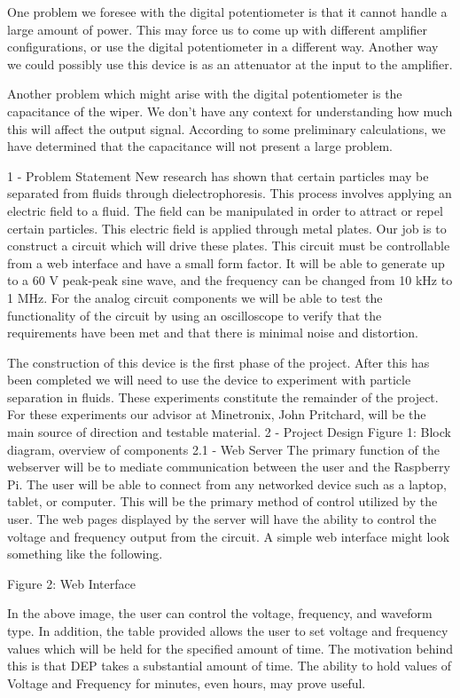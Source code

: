 \documentclass{article}	%
\begin{document}
\begin{multicols}{2}
One problem we foresee with the digital potentiometer is that it cannot handle a large amount of power. This may force us to come up with different amplifier configurations, or use the digital potentiometer in a different way. Another way we could possibly use this device is as an attenuator at the input to the amplifier.

Another problem which might arise with the digital potentiometer is the capacitance of the wiper. We don’t have any context for understanding how much this will affect the output signal. According to some preliminary calculations, we have determined that the capacitance will not present a large problem.

%
%
1 - Problem Statement
New research has shown that certain particles may be separated from fluids through dielectrophoresis. This process involves applying an electric field to a fluid. The field can be manipulated in order to attract or repel certain particles. This electric field is applied through metal plates. Our job is to construct a circuit which will drive these plates. This circuit must be controllable from a web interface and have a small form factor. It will be able to generate up to a 60 V peak-peak sine wave, and the frequency can be changed from 10 kHz to 1 MHz. For the analog circuit components we will be able to test the functionality of the circuit by using an oscilloscope to verify that the requirements have been met and that there is minimal noise and distortion. 

The construction of this device is the first phase of the project. After this has been completed we will need to use the device to experiment with particle separation in fluids. These experiments constitute the remainder of the project. For these experiments our advisor at Minetronix, John Pritchard, will be the main source of direction and testable material. 
2 - Project Design
Figure 1: Block diagram, overview of components
2.1 - Web Server
The primary function of the webserver will be to mediate communication between the user and the Raspberry Pi. The user will be able to connect from any networked device such as a laptop, tablet, or computer. This will be the primary method of control utilized by the user. The web pages displayed by the server will have the ability to control the voltage and frequency output from the circuit. A simple web interface might look something like the following.

Figure 2: Web Interface

In the above image, the user can control the voltage, frequency, and waveform type. In addition, the table provided allows the user to set voltage and frequency values which will be held for the specified amount of time. The motivation behind this is that DEP takes a substantial amount of time. The ability to hold values of Voltage and Frequency for minutes, even hours, may prove useful.


\end{multicols}
\end{document}
